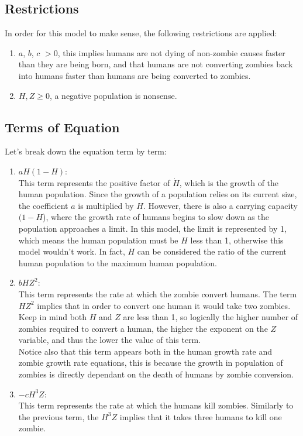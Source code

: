 \documentclass[11pt]{article}
\begin{document}
\subsection{Restrictions} 
In order for this model to make sense, the following restrictions are applied:
\begin{enumerate}
\item $a$, $b$, $c$ $> 0$, this implies humans are not dying of non-zombie causes faster than they are being born, and that humans are not converting zombies back into humans faster than humans are being converted to zombies.
\item $H,Z \geq 0$, a negative population is nonsense.
\end{enumerate}

\subsection{Terms of Equation}
Let's break down the equation term by term:
\begin{enumerate}
\item $aH(1-H)$:\\
This term represents the positive factor of $\dot{H}$, which is the growth of the human population. Since the growth of a population relies on its current size, the coefficient $a$ is multiplied by $H$. However, there is also a carrying capacity $(1 - H$), where the growth rate of humans begins to slow down as the population approaches a limit. In this model, the limit is represented by 1, which means the human population must be $H$ less than 1, otherwise this model wouldn't work. In fact, $H$ can be considered the ratio of the current human population to the maximum human population.
\item $bHZ^2$:\\
This term represents the rate at which the zombie convert humans. The term $HZ^2$ implies that in order to convert one human it would take two zombies. Keep in mind both $H$ and $Z$ are less than 1, so logically the higher number of zombies required to convert a human, the higher the exponent on the $Z$ variable, and thus the lower the value of this term.\\
Notice also that this term appears both in the human growth rate and zombie growth rate equations, this is because the growth in population of zombies is directly dependant on the death of humans by zombie conversion.
\item $-cH^3Z$:\\
This term represents the rate at which the humans kill zombies. Similarly to the previous term, the $H^3Z$ implies that it takes three humans to kill one zombie.
\end{enumerate}
\end{document}
